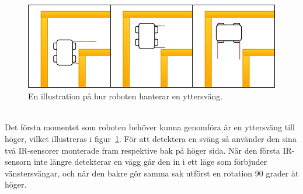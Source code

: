 \documentclass{article}
\begin{document}
\begin{figure}[H]
\centering
\includegraphics[scale=0.6]{navigation_outer_turn}
\caption{En illustration på hur roboten hanterar en yttersväng.}
\label{fig:navigation_outer_turn}
\end{figure}
\ \\
\newline
Det första momentet som roboten behöver kunna genomföra är en yttersväng till höger, vilket illustreras i figur~\ref{fig:navigation_outer_turn}. För att detektera en sväng så använder den sina två IR-sensorer monterade fram respektive bak på höger sida. När den första IR-sensorn inte längre detekterar en vägg går den in i ett läge som förbjuder vänstersvängar, och när den bakre gör samma sak utförst en rotation 90 grader åt höger.
\end{document}
